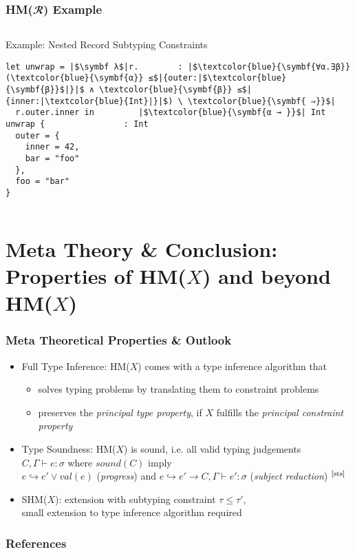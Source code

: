 \documentclass[aspectratio=169]{beamer}
\begin{document}
\begin{frame}[fragile]
  \frametitle{HM($𝓡$) Example }
  \begin{columns}
    \begin{column}{0.85\textwidth}
      \begin{center}
        \begin{block}{Example: Nested Record Subtyping Constraints}
          \begin{verbatim}
let unwrap = |$\symbf λ$|r.        : |$\textcolor{blue}{\symbf{∀α.∃β}}(\textcolor{blue}{\symbf{α}} ≤$|{outer:|$\textcolor{blue}{\symbf{β}}$|}|$ ∧ \textcolor{blue}{\symbf{β}} ≤$|{inner:|\textcolor{blue}{Int}|}|$) \ \textcolor{blue}{\symbf{ ⇒}}$|
  r.outer.inner in         |$\textcolor{blue}{\symbf{α → }}$| Int
unwrap {                : Int
  outer = {
    inner = 42, 
    bar = "foo"
  }, 
  foo = "bar"
} 
          \end{verbatim}
        \end{block}
      \end{center}
    \end{column}
  \end{columns}
\end{frame}

\section{Meta Theory \& Conclusion: Properties of HM($X$) and beyond HM($X$)}

\begingroup
\large
\begin{frame}[fragile]
  \frametitle{Meta Theoretical Properties \& Outlook}
  \begin{itemize}
    \item Full Type Inference: HM($X$) comes with a type inference algorithm
          that
          \begin{itemize}
            \item solves typing problems by translating them to constraint
                  problems
            \item preserves the \emph{principal type property}, if $X$ fulfills
                  the \emph{principal constraint property}
          \end{itemize}
    \item Type Soundness: HM($X$) is sound, i.e. all valid typing judgements
          \\ \quad $C, Γ ⊢ e : σ$ where $sound(C)$ imply \\
          \quad $e ↪ e′ ∨ val(e)$ (\emph{progress}) and
          $e ↪ e′ → C, Γ ⊢ e′ : σ$ (\emph{subject reduction})
          $^{\text{\cite{sts}}}$
    \item SHM($X$): extension with subtyping constraint $τ ≤ τ′$, \\
          \quad small extension to type inference algorithm required
  \end{itemize}
\end{frame}
\endgroup

\begin{frame}[fragile]
  \frametitle{References}
  \nocite{atapl}
  \printbibliography
\end{frame}
\end{document}
